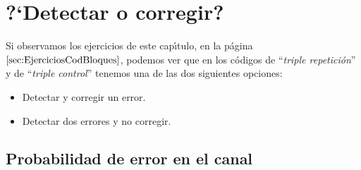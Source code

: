 %
%

\section{?`Detectar o corregir?}

Si observamos los ejercicios de este cap\'{\i}tulo, en la p\'agina
$\pageref{sec:EjerciciosCodBloques}$, podemos ver que en los c\'odigos
de ``\emph{triple repetici\'on}'' y de ``\emph{triple control}'' tenemos una
de las dos siguientes opciones:
\begin{itemize}
\item Detectar y corregir un error.
\item Detectar dos errores y no corregir.
\end{itemize}
%
\newpage
%
\subsection{Probabilidad de error en el canal}

